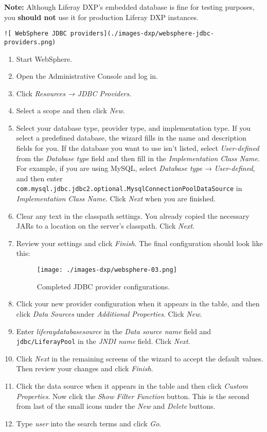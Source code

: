 \noindent\hrulefill

\textbf{Note:} Although Liferay DXP's embedded database is fine for
testing purposes, you \textbf{should not} use it for production Liferay
DXP instances.

\noindent\hrulefill

\begin{verbatim}
![ WebSphere JDBC providers](./images-dxp/websphere-jdbc-providers.png)
\end{verbatim}

\begin{enumerate}
\def\labelenumi{\arabic{enumi}.}
\item
  Start WebSphere.
\item
  Open the Administrative Console and log in.
\item
  Click \emph{Resources → JDBC Providers}.
\item
  Select a scope and then click \emph{New}.
\item
  Select your database type, provider type, and implementation type. If
  you select a predefined database, the wizard fills in the name and
  description fields for you. If the database you want to use isn't
  listed, select \emph{User-defined} from the \emph{Database type} field
  and then fill in the \emph{Implementation Class Name}. For example, if
  you are using MySQL, select \emph{Database type} →
  \emph{User-defined}, and then enter
  \texttt{com.mysql.jdbc.jdbc2.optional.MysqlConnectionPoolDataSource}
  in \emph{Implementation Class Name}. Click \emph{Next} when you are
  finished.
\item
  Clear any text in the classpath settings. You already copied the
  necessary JARs to a location on the server's classpath. Click
  \emph{Next}.
\item
  Review your settings and click \emph{Finish}. The final configuration
  should look like this:

  \begin{figure}
  \centering
  \texttt{[image: ./images-dxp/websphere-03.png]}
  \caption{Completed JDBC provider configurations.}
  \end{figure}
\item
  Click your new provider configuration when it appears in the table,
  and then click \emph{Data Sources} under \emph{Additional Properties}.
  Click \emph{New}.
\item
  Enter \emph{liferaydatabasesource} in the \emph{Data source name}
  field and \texttt{jdbc/LiferayPool} in the \emph{JNDI name} field.
  Click \emph{Next}.
\item
  Click \emph{Next} in the remaining screens of the wizard to accept the
  default values. Then review your changes and click \emph{Finish}.
\item
  Click the data source when it appears in the table and then click
  \emph{Custom Properties}. Now click the \emph{Show Filter Function}
  button. This is the second from last of the small icons under the
  \emph{New} and \emph{Delete} buttons.
\item
  Type \emph{user} into the search terms and click \emph{Go}.


\end{enumerate}
